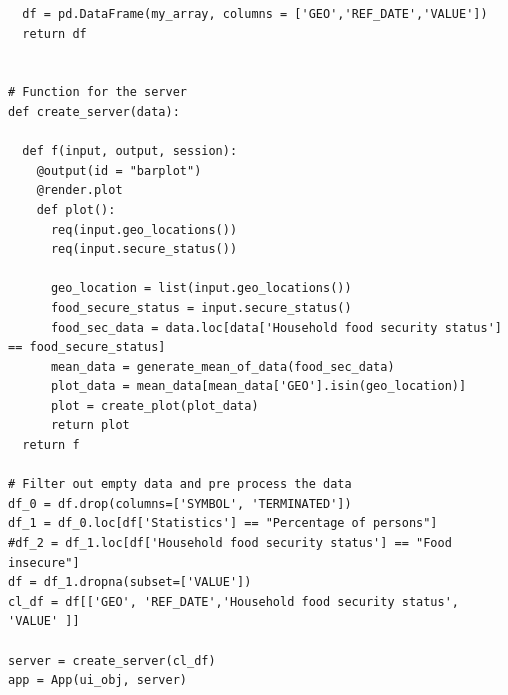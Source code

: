 \documentclass[11pt]{article}
\begin{document}
\begin{verbatim}
  df = pd.DataFrame(my_array, columns = ['GEO','REF_DATE','VALUE'])
  return df 


# Function for the server
def create_server(data):
  
  def f(input, output, session):
    @output(id = "barplot")
    @render.plot
    def plot():
      req(input.geo_locations())
      req(input.secure_status())

      geo_location = list(input.geo_locations())
      food_secure_status = input.secure_status()
      food_sec_data = data.loc[data['Household food security status'] == food_secure_status]
      mean_data = generate_mean_of_data(food_sec_data)
      plot_data = mean_data[mean_data['GEO'].isin(geo_location)]
      plot = create_plot(plot_data)
      return plot
  return f

# Filter out empty data and pre process the data
df_0 = df.drop(columns=['SYMBOL', 'TERMINATED'])
df_1 = df_0.loc[df['Statistics'] == "Percentage of persons"]
#df_2 = df_1.loc[df['Household food security status'] == "Food insecure"]
df = df_1.dropna(subset=['VALUE'])
cl_df = df[['GEO', 'REF_DATE','Household food security status',  'VALUE' ]]

server = create_server(cl_df)
app = App(ui_obj, server)

\end{verbatim}

\newpage

%

\end{document}

